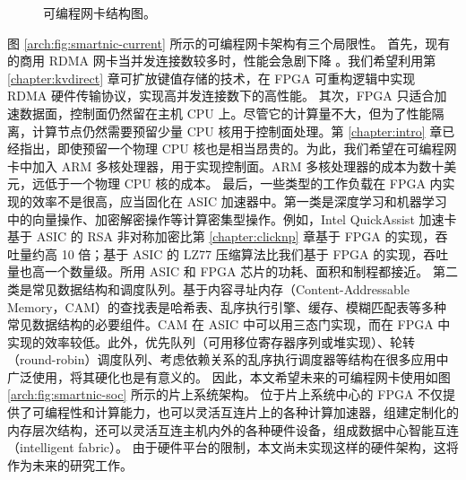 \begin{figure}[htbp]
	\centering
	\hspace{0.05\textwidth}
	\caption{可编程网卡结构图。}
\end{figure}


图 \ref{arch:fig:smartnic-current} 所示的可编程网卡架构有三个局限性。
首先，现有的商用 RDMA 网卡当并发连接数较多时，性能会急剧下降 \cite{mprdma}。我们希望利用第 \ref{chapter:kvdirect} 章可扩放键值存储的技术，在 FPGA 可重构逻辑中实现 RDMA 硬件传输协议，实现高并发连接数下的高性能。
其次，FPGA 只适合加速数据面，控制面仍然留在主机 CPU 上。尽管它的计算量不大，但为了性能隔离，计算节点仍然需要预留少量 CPU 核用于控制面处理。第 \ref{chapter:intro} 章已经指出，即使预留一个物理 CPU 核也是相当昂贵的。为此，我们希望在可编程网卡中加入 ARM 多核处理器，用于实现控制面。ARM 多核处理器的成本为数十美元，远低于一个物理 CPU 核的成本。
最后，一些类型的工作负载在 FPGA 内实现的效率不是很高，应当固化在 ASIC 加速器中。第一类是深度学习和机器学习中的向量操作、加密解密操作等计算密集型操作。例如，Intel QuickAssist 加速卡 \cite{intel-qat} 基于 ASIC 的 RSA 非对称加密比第 \ref{chapter:clicknp} 章基于 FPGA 的实现，吞吐量约高 10 倍；基于 ASIC 的 LZ77 压缩算法比我们基于 FPGA 的实现，吞吐量也高一个数量级。所用 ASIC 和 FPGA 芯片的功耗、面积和制程都接近。
第二类是常见数据结构和调度队列。基于内容寻址内存（Content-Addressable Memory，CAM）的查找表是哈希表、乱序执行引擎、缓存、模糊匹配表等多种常见数据结构的必要组件。CAM 在 ASIC 中可以用三态门实现，而在 FPGA 中实现的效率较低。此外，优先队列（可用移位寄存器序列或堆实现）、轮转（round-robin）调度队列、考虑依赖关系的乱序执行调度器等结构在很多应用中广泛使用，将其硬化也是有意义的。
因此，本文希望未来的可编程网卡使用如图 \ref{arch:fig:smartnic-soc} 所示的片上系统架构。
位于片上系统中心的 FPGA 不仅提供了可编程性和计算能力，也可以灵活互连片上的各种计算加速器，组建定制化的内存层次结构，还可以灵活互连主机内外的各种硬件设备，组成数据中心智能互连（intelligent fabric）。
由于硬件平台的限制，本文尚未实现这样的硬件架构，这将作为未来的研究工作。



